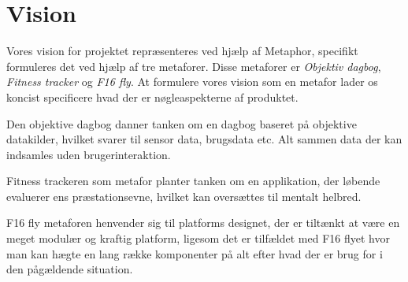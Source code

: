 \section{Vision}
Vores vision for projektet repræsenteres ved hjælp af Metaphor, specifikt formuleres det ved hjælp af tre metaforer.
Disse metaforer er \textit{Objektiv dagbog}, \textit{Fitness tracker} og \textit{F16 fly}.
At formulere vores vision som en metafor lader os koncist specificere hvad der er nøgleaspekterne af produktet.

Den objektive dagbog danner tanken om en dagbog baseret på objektive datakilder, hvilket svarer til sensor data, brugsdata etc.
Alt sammen data der kan indsamles uden brugerinteraktion.

Fitness trackeren som metafor planter tanken om en applikation, der løbende evaluerer ens præstationsevne, hvilket kan oversættes til mentalt helbred.

F16 fly metaforen henvender sig til platforms designet, der er tiltænkt at være en meget modulær og kraftig platform, ligesom det er tilfældet med F16 flyet hvor man kan hægte en lang række komponenter på alt efter hvad der er brug for i den pågældende situation.


